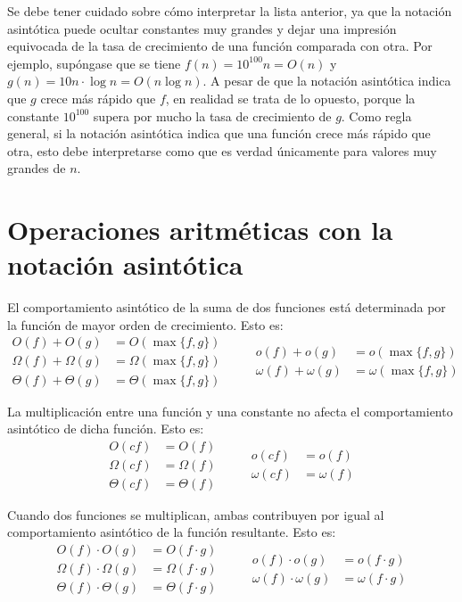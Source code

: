 Se debe tener cuidado sobre cómo interpretar la lista anterior, ya que la notación asintótica puede ocultar constantes muy grandes y dejar una impresión equivocada de la tasa de crecimiento de una función comparada con otra. 
Por ejemplo, supóngase que se tiene \(f(n)=10^{100}n=O(n)\) y \(g(n)=10n\cdot\log n=O(n\log n)\). 
A pesar de que la notación asintótica indica que \(g\) crece más rápido que \(f\), en realidad se trata de lo opuesto, porque la constante \(10^{100}\) supera por mucho la tasa de crecimiento de \(g\).
Como regla general, si la notación asintótica indica que una función crece más rápido que otra, esto debe interpretarse como que es verdad únicamente para valores muy grandes de \(n\).

\section{Operaciones aritméticas con la notación asintótica}

El comportamiento asintótico de la suma de dos funciones está determinada por la función de mayor orden de crecimiento. 
Esto es:
\[
\begin{aligned}
    O(f)+O(g) &= O(\max\{f,g\})\\
    \Omega(f)+\Omega(g) &= \Omega(\max\{f,g\})\\
    \Theta(f)+\Theta(g) &= \Theta(\max\{f,g\})
\end{aligned}
\qquad
\begin{aligned}
    o(f)+o(g) &= o(\max\{f,g\})\\
    \omega(f)+\omega(g) &= \omega(\max\{f,g\})
\end{aligned}
\]

La multiplicación entre una función y una constante no afecta el
comportamiento asintótico de dicha función. 
Esto es:
\[
\begin{aligned}
    O(cf) &= O(f)\\
    \Omega(cf) &= \Omega(f)\\
    \Theta(cf) &= \Theta(f)
\end{aligned}
\qquad
\begin{aligned}
    o(cf) &= o(f)\\
    \omega(cf) &= \omega(f)
\end{aligned}
\]

Cuando dos funciones se multiplican, ambas contribuyen por igual al
comportamiento asintótico de la función resultante. 
Esto es:
\[
\begin{aligned}
    O(f)\cdot O(g) &= O(f\cdot g)\\
    \Omega(f)\cdot\Omega(g) &= \Omega(f\cdot g)\\
    \Theta(f)\cdot\Theta(g) &= \Theta(f\cdot g)
\end{aligned}
\qquad
\begin{aligned}
    o(f)\cdot o(g) &= o(f\cdot g)\\
    \omega(f)\cdot\omega(g) &= \omega(f\cdot g)
\end{aligned}
\]

